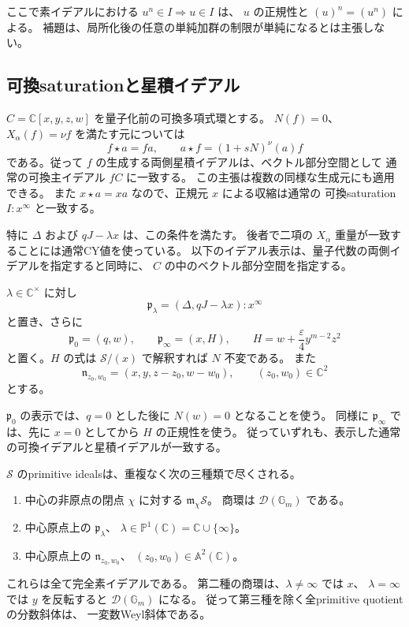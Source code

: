 ここで素イデアルにおける $u^n\in I\Rightarrow u\in I$ は、
$u$ の正規性と $(u)^n=(u^n)$ による。
補題は、局所化後の任意の単純加群の制限が単純になるとは主張しない。

\subsection{可換saturationと星積イデアル}

$C=\mathbb C[x,y,z,w]$ を量子化前の可換多項式環とする。
$N(f)=0$、$X_\alpha(f)=\nu f$ を満たす元については
\[
 f\star a=fa,\qquad a\star f=(1+sN)^\nu(a)f
\]
である。従って $f$ の生成する両側星積イデアルは、ベクトル部分空間として
通常の可換主イデアル $fC$ に一致する。
この主張は複数の同様な生成元にも適用できる。
また $x\star a=xa$ なので、正規元 $x$ による収縮は通常の
可換saturation $I:x^\infty$ と一致する。

特に $\Delta$ および $qJ-\lambda x$ は、この条件を満たす。
後者で二項の $X_\alpha$ 重量が一致することには通常CY値を使っている。
以下のイデアル表示は、量子代数の両側イデアルを指定すると同時に、
$C$ の中のベクトル部分空間を指定する。

\begin{definition}
\label{def:origin-primitives-v36}
$\lambda\in\mathbb C^\times$ に対し
\[
 \mathfrak p_\lambda
   =(\Delta,qJ-\lambda x):x^\infty
\]
と置き、さらに
\[
 \mathfrak p_0=(q,w),\qquad
 \mathfrak p_\infty=(x,H),\qquad
 H=w+\frac{\varepsilon}{4}y^{m-2}z^2
\]
と置く。$H$ の式は $\mathcal S/(x)$ で解釈すれば $N$ 不変である。
また
\[
 \mathfrak n_{z_0,w_0}=(x,y,z-z_0,w-w_0),
 \qquad (z_0,w_0)\in\mathbb C^2
\]
とする。
\end{definition}

$\mathfrak p_0$ の表示では、$q=0$ とした後に $N(w)=0$ となることを使う。
同様に $\mathfrak p_\infty$ では、先に $x=0$ としてから $H$ の正規性を使う。
従っていずれも、表示した通常の可換イデアルと星積イデアルが一致する。

\begin{theorem}
\label{thm:all-primitives-v36}
$\mathcal S$ のprimitive idealsは、重複なく次の三種類で尽くされる。
\begin{enumerate}
\item 中心の非原点の閉点 $\chi$ に対する
      $\mathfrak m_\chi\mathcal S$。
      商環は $\mathcal D(\mathbb G_m)$ である。
\item 中心原点上の $\mathfrak p_\lambda$、
      $\lambda\in\mathbb P^1(\mathbb C)=\mathbb C\cup\{\infty\}$。
\item 中心原点上の $\mathfrak n_{z_0,w_0}$、
      $(z_0,w_0)\in\mathbb A^2(\mathbb C)$。
\end{enumerate}
これらは全て完全素イデアルである。
第二種の商環は、$\lambda\ne\infty$ では $x$、
$\lambda=\infty$ では $y$ を反転すると
$\mathcal D(\mathbb G_m)$ になる。
従って第三種を除く全primitive quotientの分数斜体は、
一変数Weyl斜体である。
\end{theorem}

